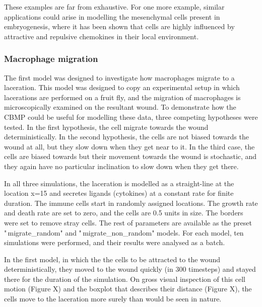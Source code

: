 \documentclass[12pt,a4paper]{report}
\begin{document}
These examples are far from exhaustive. For one more example, similar 
applications could arise in modelling the mesenchymal cells present in 
embryogenesis, where it has been shown that cells are highly influenced 
by attractive and repulsive chemokines in their local environment.

\subsubsection{Macrophage migration}
The first model was designed to investigate how macrophages migrate to a 
laceration. This model was designed to copy an experimental setup in 
which lacerations are performed on a fruit fly, and the migration of 
macrophages is microscopically examined on the resultant wound. To 
demonstrate how the CBMP could be useful for modelling these data, three 
competing hypotheses were tested. In the first hypothesis, the cell 
migrate towards the wound deterministically. In the second hypothesis, 
the cells are not biased towards the wound at all, but they slow down 
when they get near to it. In the third case, the cells are biased 
towards but their movement towards the wound is stochastic, and they 
again have no particular inclination to slow down when they get there.



In all three simulations, the laceration is modelled as a straight-line 
at the location x=15 and secretes ligands (cytokines) at a constant rate 
for finite duration. The immune cells start in randomly assigned 
locations. The growth rate and death rate are set to zero, and the cells 
are 0.5 units in size. The borders were set to remove stray cells. The 
rest of parameters are available as the preset "\,migrate\_random" and 
"\,migrate\_non\_random" models. For each model, ten simulations were 
performed, and their results were analysed as a batch.



In the first model, in which the the cells to be attracted to the wound 
deterministically, they moved to the wound quickly (in 300 timesteps) 
and stayed there for the duration of the simulation. On gross visual 
inspection of this cell motion (Figure X) and the boxplot that describes 
their distance (Figure X), the cells move to the laceration more surely 
than would be seen in nature.



\begin{figure}[H]
\centering
\end{figure}
\end{document}
